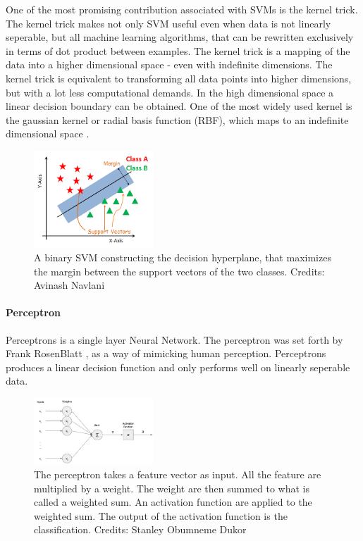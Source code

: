 One of the most promising contribution associated with SVMs is the kernel trick. The kernel trick makes not only SVM useful even when data is not linearly seperable, but all machine learning algorithms, that can be rewritten exclusively in terms of dot product between examples. The kernel trick is a mapping of the data into a higher dimensional space - even with indefinite dimensions. The kernel trick is equivalent to transforming all data points into higher dimensions, but with a lot less computational demands. In the high dimensional space a linear decision boundary can be obtained. One of the most widely used kernel is the gaussian kernel or radial basis function (RBF), which maps to an indefinite dimensional space \cite{Goodfellow-et-al-2016}.

\begin{figure}[H]
    \centering
    \includegraphics[width=0.4\textwidth]{figures/svm.png}
    \caption[]{A binary SVM constructing the decision hyperplane, that maximizes the margin between the support vectors of the two classes. Credits: Avinash Navlani}
    \label{fig:svm}
\end{figure}

\paragraph{Perceptron}

Perceptrons is a single layer Neural Network. The perceptron was set forth by Frank RosenBlatt \cite{Perceptron}, as a way of mimicking human perception. Perceptrons produces a linear decision function and only performs well on linearly seperable data. 

\begin{figure}[H]
    \centering
    \includegraphics[width=0.4\textwidth]{figures/perceptron.png}
    \caption[]{The perceptron takes a feature vector as input. All the feature are multiplied by a weight. The weight are then summed to what is called a weighted sum. An activation function are applied to the weighted sum. The output of the activation function is the classification. Credits: Stanley Obumneme Dukor}
    \label{fig:perc}
\end{figure}

